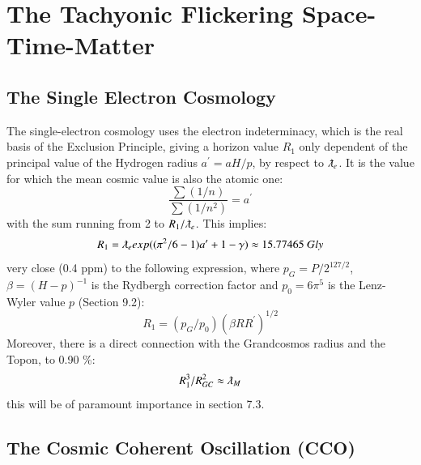 \documentclass[twoside,draft]{article}
\begin{document}
\begin{sloppypar}
\section{The Tachyonic Flickering Space-Time-Matter}

\subsection{The Single Electron Cosmology}

The single-electron cosmology \cite{Sanchez1} uses the electron indeterminacy, which is the real basis of the Exclusion Principle, giving a horizon value $R_1$ only dependent of the principal value of the Hydrogen radius $a^{\prime} = aH/p$, by respect to $\lambdabar_e$. It is the value for which the mean cosmic value is also the atomic one:
\begin{equation}
\frac{\sum(1/n)}{\sum(1/n^{2})} = a^{\prime}
\end{equation}
with the sum running from 2 to $R_{1} /\lambdabar_{e}$. This implies:
$$
R_{1} = \lambdabar_{e} exp((\pi^{2} /6 - 1)a^{\prime} + 1 - \gamma) \approx 15.77465 ~ Gly
$$
very close (0.4 ppm) to the following expression, where $p_{G} = P/2^{127/2}$, $\beta = (H - p)^{-1}$ is the Rydbergh correction factor and $p_{0} = 6\pi^{5}$ is the Lenz-Wyler value $p$ (Section 9.2):
$$
R_{1} = ( p_{G} /p_{0} )(\beta R R^{\prime})^{1/2}
$$
Moreover, there is a direct connection with the Grandcosmos radius and the Topon, to 0.90 \%:
\begin{equation}
R_1^3/R_{GC}^2 \approx \lambdabar_M  
\end{equation}
this will be of paramount importance in section 7.3.



\subsection{The Cosmic Coherent Oscillation (CCO)}


\end{sloppypar}
\end{document}
